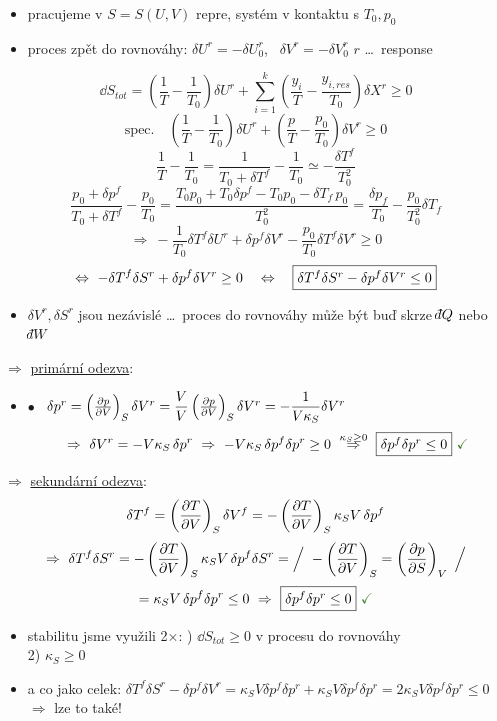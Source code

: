 \begin{itemize}[nosep]
  \item pracujeme v $S = S(U,V)$ repre, systém v kontaktu s $T_0, p_0$
  \item proces zpět do rovnováhy: \quad $\delta U^r = -\delta U_0^r$, \ $\delta V^r = -\delta V_0^r$ \qquad $r$ \dots\ response
\end{itemize}
\[
  \dd S_{tot} = \left(\frac1T - \frac{1}{T_0}\right)\delta U^r + \sum_{i=1}^{k}\left(\frac{y_i}{T} - \frac{y_{i,res}}{T_0}\right)\delta X^r \geq 0
\]
\[
  \text{spec.}\quad \left(\frac1T - \frac{1}{T_0}\right)\delta U^r + \left(\frac{p}{T} - \frac{p_0}{T_0}\right)\delta V^r \geq 0
\]
\[
  \frac1T - \frac{1}{T_0} = \frac{1}{T_0 + \delta T^f} - \frac{1}{T_0} \simeq -\frac{\delta T^f}{T_0^2}
\]
\[
  \frac{p_0 + \delta p^f}{T_0 + \delta T^f} - \frac{p_0}{T_0} = \frac{T_0p_0 + T_0\delta p^f - T_0p_0 - \delta T_f\,p_0}{T_0^2}
  = \frac{\delta p_f}{T_0} - \frac{p_0}{T_0^2}\delta T_f
\]
\[
  \Rightarrow\ -\frac{1}{T_0}\delta T^f\delta U^r + \delta p^f\delta V^r - \frac{p_0}{T_0}\delta T^f\delta V^r \geq 0
\]
\[
  \Leftrightarrow\ -\delta T^f\delta S^r + \delta p^f\delta V^r \geq 0
  \quad\Leftrightarrow\quad \fbox{$\delta T^f\delta S^r - \delta p^f\delta V^r \leq 0$}
\]
\begin{itemize}
  \item $\delta V^r, \delta S^r$ jsou nezávislé \dots\ proces do rovnováhy může být buď skrze $\dbar Q$ nebo $\dbar W$
\end{itemize}
$\Rightarrow$ \underline{primární odezva}: 
\begin{itemize}
  \item[] $\bullet$ \ $\delta p^r = \left(\pdv{p}{V}\right)_S\delta V^r = \dfrac{V}{V}\left(\pdv{p}{V}\right)_S\delta V^r = -\dfrac{1}{V\kappa_S}\delta V^r$
  \[
    \Rightarrow\ \delta V^r = -V\kappa_S\,\delta p^r \ \Rightarrow\ -V\kappa_S\,\delta p^f\delta p^r \geq 0
    \ \overset{\kappa_S\geq0}{\Rightarrow}\ \fbox{$\delta p^f\delta p^r \leq 0$}\ \textcolor{OliveGreen}{\checkmark}
  \]
\end{itemize}
$\Rightarrow$ \underline{sekundární odezva}: 
\[
  \delta T^f = \left(\pdv{T}{V}\right)_S\delta V^f = -\left(\pdv{T}{V}\right)_S\kappa_SV\,\delta p^f
\]
\[
  \Rightarrow\ \delta T^f\delta S^r = -\left(\pdv{T}{V}\right)_S\kappa_SV\,\delta p^f\delta S^r
  = \Big/\ -\left(\pdv{T}{V}\right)_S = \left(\pdv{p}{S}\right)_V\ \Big/
\]
\[
  = \kappa_SV\,\delta p^f\delta p^r \leq 0 \ \Rightarrow\ \fbox{$\delta p^f\delta p^r \leq 0$}\ \textcolor{OliveGreen}{\checkmark}
\]
\begin{itemize}
  \item stabilitu jsme využili 2$\times$: ) $\dd S_{tot} \geq 0$ v procesu do rovnováhy \\
        \hspace*{4.3cm} 2) $\kappa_S \geq 0$
  \item a co jako celek: \quad $\delta T^f\delta S^r - \delta p^f\delta V^r = \kappa_SV\delta p^f\delta p^r + \kappa_SV\delta p^f\delta p^r = 2\kappa_SV\delta p^f\delta p^r \leq 0$ \\
        $\Rightarrow$ lze to také!
\end{itemize}
\endgroup

